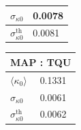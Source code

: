 \documentclass[prd, superscriptaddress, tightenlines, longbibliography, nofootinbib, eqsecnum, amsfonts, amsmath, floatfix, twocolumn, notitlepage]{revtex4-2}
\begin{document}
\begin{table}
\begin{tabularx}{0.15\textwidth}{|X|X|}
    $\sigma_{\kappa 0}$ & 0.0078  \\\hline
    $\sigma_{\kappa 0}^{\text{th}}$ & 0.0081  \\\hline
    \end{tabularx}
    \begin{tabularx}{0.15\textwidth}{|X|X|}
    \hline
    \multicolumn{2}{|c|}{MAP : TQU} \\ \hline
    $\langle\kappa_0 \rangle$      & 0.1331   \\ \hline
    $\sigma_{\kappa 0}$ & 0.0061  \\\hline
    $\sigma_{\kappa 0}^{\text{th}}$ & 0.0062  \\\hline
    \end{tabularx}
    \label{tab:results}
\end{table}
\end{document}
